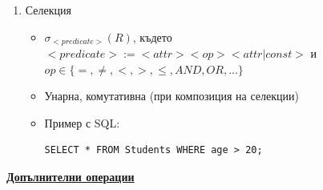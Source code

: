 \documentclass{article}
\begin{document}
\begin{enumerate}
        \begin{itemize}
            \item $\pi_{<attr list>}(R)$, където $<attrlist>$ е списък с атрибути
            \item Унарна
            \item Пример с SQL:
\begin{lstlisting}[style=sql]
SELECT name, age FROM Students;
\end{lstlisting}
        \end{itemize}
    \item Селекция
        \begin{itemize}
            \item $\sigma_{<predicate>}(R)$, където $<predicate> := <attr><op><attr|const>$ и $op \in \{=, \neq, <, >, \le, AND, OR, ...\}$
            \item Унарна, комутативна (при композиция на селекции)
            \item Пример с SQL:
\begin{lstlisting}[style=sql]
SELECT * FROM Students WHERE age > 20;
\end{lstlisting}
        \end{itemize}
\end{enumerate}
\textbf{\underline{Допълнителни операции}}
\end{document}
